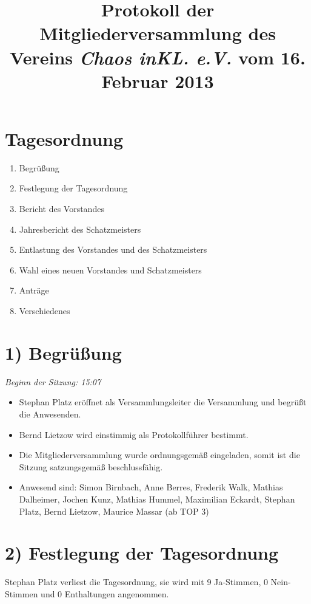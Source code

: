 \documentclass{scrartcl}
\title{Protokoll der Mitgliederversammlung des Vereins \emph{Chaos inKL. e.V.} vom 16. Februar 2013}
\begin{document}
 
\maketitle

\section*{Tagesordnung}

\begin{enumerate}
  \setlength{\itemsep}{1pt}
  \item Begrüßung
  \item Festlegung der Tagesordnung
  \item Bericht des Vorstandes
  \item Jahresbericht des Schatzmeisters
  \item Entlastung des Vorstandes und des Schatzmeisters
  \item Wahl eines neuen Vorstandes und Schatzmeisters
  \item Anträge
  \item Verschiedenes
\end{enumerate}

\section*{1) Begrüßung}

    \emph{Beginn der Sitzung: 15:07}\\
    \begin{itemize}
     \item Stephan Platz eröffnet als Versammlungsleiter die Versammlung und begrüßt die Anwesenden.
     \item Bernd Lietzow wird einstimmig als Protokollführer bestimmt.
     \item Die Mitgliederversammlung wurde ordnungsgemäß eingeladen, somit ist die Sitzung satzungsgemäß beschlussfähig.
     \item Anwesend sind:  Simon Birnbach, Anne Berres, Frederik Walk, Mathias Dalheimer, Jochen Kunz, Mathias Hummel, Maximilian Eckardt, Stephan Platz, Bernd Lietzow, Maurice Massar (ab TOP 3) 
    \end{itemize}

\section*{2) Festlegung der Tagesordnung}
    
    Stephan Platz verliest die Tagesordnung, sie wird mit 9 Ja-Stimmen, 0 Nein-Stimmen und 0 Enthaltungen angenommen.
\end{document}

